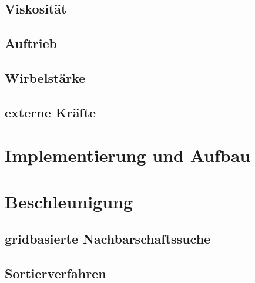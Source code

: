 \documentclass[intern,palatino]{cgBA}
\begin{document}
\subsection{Viskosität}


\subsection{Auftrieb}


\subsection{Wirbelstärke}


\subsection{externe Kräfte}


\section{Implementierung und Aufbau}


\section{Beschleunigung}


\subsection{gridbasierte Nachbarschaftssuche}


\subsection{Sortierverfahren}
\end{document}
